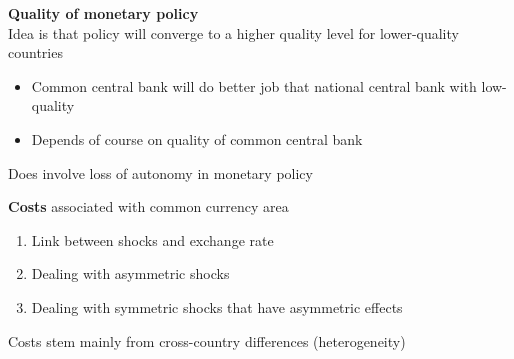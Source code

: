 \documentclass{beamer}
\begin{document}
\begin{frame}
  \textbf{Quality of monetary policy}\\ \medskip
  Idea is that policy will converge to a higher quality level for lower-quality countries
  \begin{itemize}
    \item Common central bank will do better job that national central bank with low-quality
    \item Depends of course on quality of common central bank
  \end{itemize}
  \medskip
  Does involve loss of autonomy in monetary policy
\end{frame}

\begin{frame}
  \textbf{Costs} associated with common currency area  
  \begin{enumerate}
    \item Link between shocks and exchange rate
    \item Dealing with asymmetric shocks
    \item Dealing with symmetric shocks that have asymmetric effects
  \end{enumerate}
  \medskip
  Costs stem mainly from cross-country differences (heterogeneity)
\end{frame}
\end{document}
